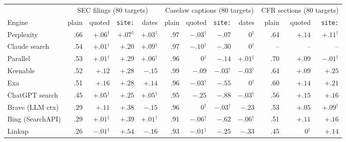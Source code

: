 \begin{tabular}{@{}lrrrrrrrrrrr@{}}
\toprule
 & \multicolumn{4}{c}{SEC filings (80 targets)} & \multicolumn{4}{c}{Caselaw captions (80 targets)} & \multicolumn{3}{c}{CFR sections (80 targets)} \\
\cmidrule(lr){2-5}\cmidrule(lr){6-9}\cmidrule(lr){10-12}
Engine & plain & quoted & \texttt{site:} & dates & plain & quoted & \texttt{site:} & dates & plain & quoted & \texttt{site:} \\
\midrule
Perplexity & .66 & \textcolor{ink2}{$+.06$}$^{\dagger}$ & \textcolor{ink2}{$+.07$}$^{\dagger}$ & \textcolor{ink2}{$+.03$}$^{\dagger}$ & .97 & \textcolor{ink2}{$-.03$}$^{\dagger}$ & $-.07$ & \textcolor{ink2}{0}$^{\dagger}$ & .64 & $+.14$ & \textcolor{ink2}{$+.11$}$^{\dagger}$ \\
Claude search & .54 & \textcolor{ink2}{$+.01$}$^{\dagger}$ & $+.20$ & \textcolor{ink2}{$+.09$}$^{\dagger}$ & .97 & \textcolor{ink2}{$-.10$}$^{\dagger}$ & $-.30$ & \textcolor{ink2}{0}$^{\dagger}$ & -- & -- & -- \\
Parallel & .53 & \textcolor{ink2}{$+.01$}$^{\dagger}$ & $+.29$ & \textcolor{ink2}{$+.06$}$^{\dagger}$ & .96 & \textcolor{ink2}{0}$^{\dagger}$ & $-.14$ & \textcolor{ink2}{$+.01$}$^{\dagger}$ & .70 & $+.09$ & \textcolor{ink2}{$-.01$}$^{\dagger}$ \\
Keenable & .52 & $+.12$ & $+.28$ & $-.15$ & .99 & $-.09$ & \textcolor{ink2}{$-.03$}$^{\dagger}$ & \textcolor{ink2}{$-.03$}$^{\dagger}$ & .64 & $+.09$ & $+.25$ \\
Exa & .51 & $+.16$ & $+.28$ & $+.14$ & .96 & \textcolor{ink2}{$-.03$}$^{\dagger}$ & $-.55$ & \textcolor{ink2}{0}$^{\dagger}$ & .60 & $+.14$ & $+.21$ \\
ChatGPT search & .45 & \textcolor{ink2}{$+.05$}$^{\dagger}$ & $+.25$ & \textcolor{ink2}{$+.05$}$^{\dagger}$ & .95 & $-.25$ & $-.88$ & \textcolor{ink2}{$-.03$}$^{\dagger}$ & .56 & $+.15$ & $+.16$ \\
Brave (LLM ctx) & .29 & $+.11$ & $+.38$ & $-.15$ & .96 & \textcolor{ink2}{0}$^{\dagger}$ & \textcolor{ink2}{$-.03$}$^{\dagger}$ & $-.23$ & .53 & $+.05$ & \textcolor{ink2}{$+.09$}$^{\dagger}$ \\
Bing (SearchAPI) & .29 & \textcolor{ink2}{$+.01$}$^{\dagger}$ & $+.39$ & \textcolor{ink2}{$+.01$}$^{\dagger}$ & .91 & \textcolor{ink2}{$-.06$}$^{\dagger}$ & $-.62$ & \textcolor{ink2}{$-.06$}$^{\dagger}$ & .51 & $+.11$ & $+.16$ \\
Linkup & .26 & \textcolor{ink2}{$-.01$}$^{\dagger}$ & $+.54$ & $-.16$ & .93 & \textcolor{ink2}{$-.01$}$^{\dagger}$ & $-.25$ & $-.33$ & .45 & \textcolor{ink2}{0}$^{\dagger}$ & $+.14$ \\

\end{tabular}

